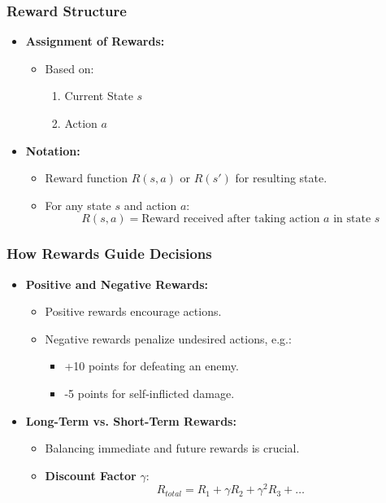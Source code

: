 \documentclass{beamer}
\begin{document}
\begin{frame}[fragile]
    \frametitle{Reward Structure}
    
    \begin{itemize}
        \item \textbf{Assignment of Rewards:}
        \begin{itemize}
            \item Based on:
            \begin{enumerate}
                \item Current State \( s \)
                \item Action \( a \)
            \end{enumerate}
        \end{itemize}
        
        \item \textbf{Notation:}
        \begin{itemize}
            \item Reward function \( R(s, a) \) or \( R(s') \) for resulting state.
            \item For any state \( s \) and action \( a \):
            \[
                R(s, a) = \text{Reward received after taking action } a \text{ in state } s
            \]
        \end{itemize}
    \end{itemize}
\end{frame}

\begin{frame}[fragile]
    \frametitle{How Rewards Guide Decisions}
    
    \begin{itemize}
        \item \textbf{Positive and Negative Rewards:}
        \begin{itemize}
            \item Positive rewards encourage actions.
            \item Negative rewards penalize undesired actions, e.g.:
            \begin{itemize}
                \item +10 points for defeating an enemy.
                \item -5 points for self-inflicted damage.
            \end{itemize}
        \end{itemize}
        
        \item \textbf{Long-Term vs. Short-Term Rewards:}
        \begin{itemize}
            \item Balancing immediate and future rewards is crucial.
            \item \textbf{Discount Factor} \( \gamma \):
            \[
                R_{total} = R_1 + \gamma R_2 + \gamma^2 R_3 + \ldots
            \]
        \end{itemize}
    \end{itemize}
\end{frame}
\end{document}
